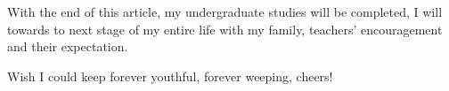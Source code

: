 With the end of this article, my undergraduate studies will be completed, I will towards to next stage of my entire life with my family, teachers' encouragement and their expectation.

Wish I could keep forever youthful, forever weeping, cheers!

\clearpage
~~\thispagestyle{empty}
\clearpage
